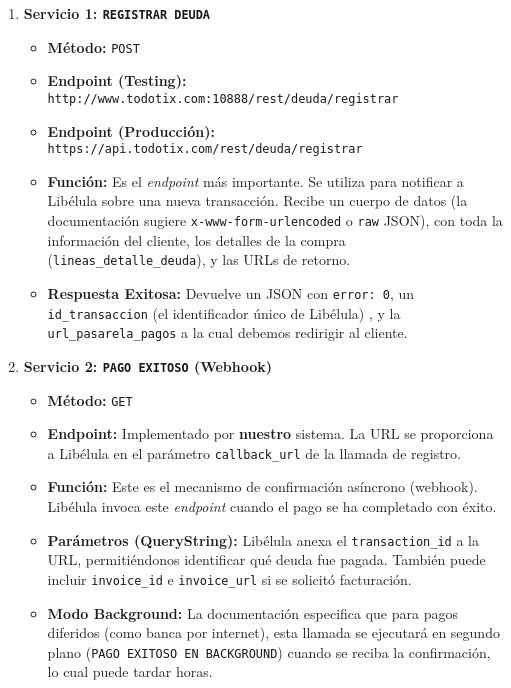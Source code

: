         \begin{enumerate}
            \item \textbf{Servicio 1: \texttt{REGISTRAR DEUDA}}
            \begin{itemize}
                \item \textbf{Método:} \texttt{POST} 
                \item \textbf{Endpoint (Testing):} \texttt{http://www.todotix.com:10888/rest/deuda/registrar}
                \item \textbf{Endpoint (Producción):} \texttt{https://api.todotix.com/rest/deuda/registrar}
                \item \textbf{Función:} Es el \emph{endpoint} más importante. Se utiliza para notificar a Libélula sobre una nueva transacción. Recibe un cuerpo de datos (la documentación sugiere \texttt{x-www-form-urlencoded} o \texttt{raw} JSON), con toda la información del cliente, los detalles de la compra (\texttt{lineas\_detalle\_deuda}), y las URLs de retorno.
                \item \textbf{Respuesta Exitosa:} Devuelve un JSON con \texttt{error: 0}, un \texttt{id\_transaccion} (el identificador único de Libélula) , y la \texttt{url\_pasarela\_pagos} a la cual debemos redirigir al cliente.
            \end{itemize}

            \item \textbf{Servicio 2: \texttt{PAGO EXITOSO} (Webhook)}
            \begin{itemize}
                \item \textbf{Método:} \texttt{GET} 
                \item \textbf{Endpoint:} Implementado por \textbf{nuestro} sistema. La URL se proporciona a Libélula en el parámetro \texttt{callback\_url} de la llamada de registro.
                \item \textbf{Función:} Este es el mecanismo de confirmación asíncrono (webhook). Libélula invoca este \emph{endpoint} cuando el pago se ha completado con éxito.
                \item \textbf{Parámetros (QueryString):} Libélula anexa el \texttt{transaction\_id} a la URL, permitiéndonos identificar qué deuda fue pagada. También puede incluir \texttt{invoice\_id} e \texttt{invoice\_url} si se solicitó facturación.
                \item \textbf{Modo Background:} La documentación especifica que para pagos diferidos (como banca por internet), esta llamada se ejecutará en segundo plano (\texttt{PAGO EXITOSO EN BACKGROUND}) cuando se reciba la confirmación, lo cual puede tardar horas.
            \end{itemize}


\end{enumerate}
